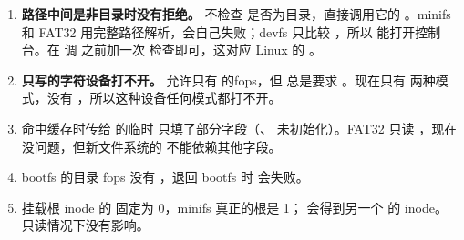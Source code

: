\begin{enumerate}
  \item \textbf{路径中间是非目录时没有拒绝。}  不检查  是否为目录，直接调用它的 。minifs 和 FAT32 用完整路径解析，会自己失败；devfs 只比较 ，所以  能打开控制台。在  调  之前加一次  检查即可，这对应 Linux 的 。
  \item \textbf{只写的字符设备打不开。}  允许只有  的fops，但  总是要求 。现在只有 两种模式，没有 ，所以这种设备任何模式都打不开。
  \item {} 命中缓存时传给  的临时  只填了部分字段（、 未初始化）。FAT32 只读 ，现在没问题，但新文件系统的  不能依赖其他字段。
  \item bootfs 的目录 fops 没有 ，退回 bootfs 时  会失败。
  \item 挂载根 inode 的  固定为 0，minifs 真正的根是 1； 会得到另一个 的 inode。只读情况下没有影响。
\end{enumerate}
